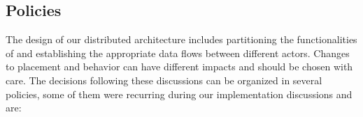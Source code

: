 \subsection{Policies}\label{sec:policies}

The design of our distributed \nd architecture includes partitioning the
functionalities of \minas and establishing the appropriate data flows
between different actors.
Changes to placement and behavior can have different impacts and should be
chosen with care.
% 
% 
The decisions following these discussions can be organized in several policies,
some of them were recurring during our implementation discussions and are:

